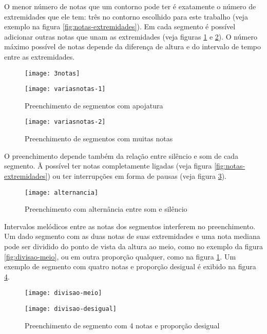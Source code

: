 \documentclass[12pt]{article}
\begin{document}
O menor número de notas que um contorno pode ter é exatamente o número
de extremidades que ele tem: três no contorno escolhido para este
trabalho (veja exemplo na figura \ref{fig:notas-extremidades}). Em
cada segmento é possível adicionar outras notas que unam as
extremidades (veja figuras \ref{fig:varias-apojatura} e
\ref{fig:muitas-notas}). O número máximo possível de notas depende da
diferença de altura e do intervalo de tempo entre as extremidades.

\begin{figure}[h]
\begin{minipage}{8cm}
  \centering
  \texttt{[image: 3notas]}
  \caption{Preenchimento com notas apenas nas extremidades}
  \label{fig:notas-extremidades}
\end{minipage}
\hfill
\begin{minipage}{8cm}
  \centering
  \texttt{[image: variasnotas-1]}
  \caption{Preenchimento de segmentos com apojatura}
  \label{fig:varias-apojatura}
\end{minipage}
\hfill
\end{figure}

\begin{figure}[h]
  \centering
  \texttt{[image: variasnotas-2]}
  \caption{Preenchimento de segmentos com muitas notas}
  \label{fig:muitas-notas}
\end{figure}

O preenchimento depende também da relação entre silêncio e som de cada
segmento. Ã possível ter notas completamente ligadas (veja figura
\ref{fig:notas-extremidades}) ou ter interrupções em forma de pausas
(veja figura \ref{fig:alternancia}).

\begin{figure}[h]
  \centering
  \texttt{[image: alternancia]}
  \caption{Preenchimento com alternância entre som e silêncio}
  \label{fig:alternancia}
\end{figure}

Intervalos melódicos entre as notas dos segmentos interferem no
preenchimento. Um dado segmento com as duas notas de suas extremidades
e uma nota mediana pode ser dividido do ponto de vista da altura ao
meio, como no exemplo da figura \ref{fig:divisao-meio}, ou em outra
proporção qualquer, como na figura \ref{fig:varias-apojatura}. Um
exemplo de segmento com quatro notas e proporção desigual é exibido na
figura \ref{fig:divisao-desigual}.

\begin{figure}[h]
\begin{minipage}{8cm}
  \centering
  \texttt{[image: divisao-meio]}
  \caption{Preenchimento de segmento com 3 notas com proporção de 1:1}
  \label{fig:divisao-meio}
\end{minipage}
\hfill
\begin{minipage}{8cm}
  \centering
  \texttt{[image: divisao-desigual]}
  \caption{Preenchimento de segmento com 4 notas e proporção desigual}
  \label{fig:divisao-desigual}
\end{minipage}
\hfill
\end{figure}
\end{document}
